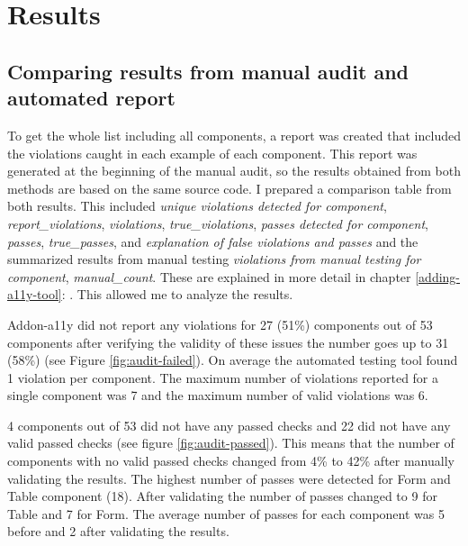 \documentclass{master_thesis}
\begin{document}
\section{Results}


\subsection{Comparing results from manual audit and automated report}

To get the whole list including all components, a report was created that included the violations caught in each example of each component. This report was generated at the beginning of the manual audit, so the results obtained from both methods are based on the same source code. I prepared a comparison table from both results. This included \textit{unique violations detected for component}, \textit{report\_violations}, \textit{violations}, \textit{true\_violations}, \textit{passes detected for component}, \textit{passes}, \textit{true\_passes}, and \textit{explanation of false violations and passes} and the summarized results from manual testing \textit{violations from manual testing for component}, \textit{manual\_count}. These are explained in more detail in chapter \ref{adding-a11y-tool}: . This allowed me to analyze the results.

Addon-a11y did not report any violations for 27 (51\%) components out of 53 components after verifying the validity of these issues the number goes up to 31 (58\%) (see Figure \ref{fig:audit-failed}). On average the automated testing tool found 1 violation per component. The maximum number of violations reported for a single component was 7 and the maximum number of valid violations was 6.

4 components out of 53 did not have any passed checks and 22 did not have any valid passed checks (see figure \ref{fig:audit-passed}). This means that the number of components with no valid passed checks changed from 4\%  to 42\% after manually validating the results. The highest number of passes were detected for Form and Table component (18). After validating the number of passes changed to 9 for Table and 7 for Form. The average number of passes for each component was 5 before and 2 after validating the results.
\end{document}
